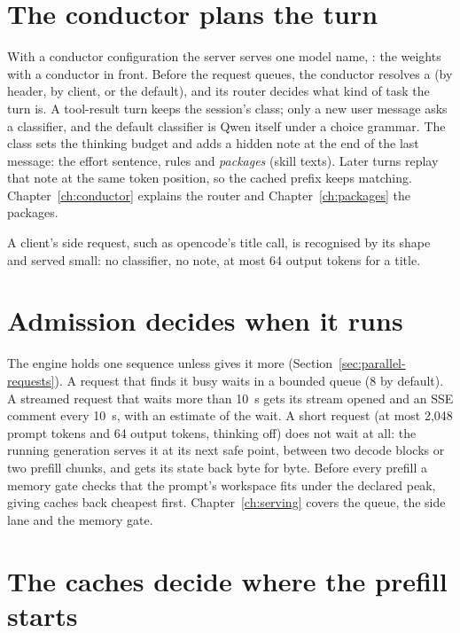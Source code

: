 \section{The conductor plans the turn}

With a conductor configuration the server serves one model name, : the weights with a conductor in front. Before the request queues, the conductor resolves a  (by header, by client, or the default), and its router decides what kind of task the turn is. A tool-result turn keeps the session's class; only a new user message asks a classifier, and the default classifier is Qwen itself under a choice grammar. The class sets the thinking budget and adds a hidden note at the end of the last message: the effort sentence, rules and \emph{packages} (skill texts). Later turns replay that note at the same token position, so the cached prefix keeps matching. Chapter~\ref{ch:conductor} explains the router and Chapter~\ref{ch:packages} the packages.

A client's side request, such as opencode's title call, is recognised by its shape and served small: no classifier, no note, at most 64 output tokens for a title.

\section{Admission decides when it runs}

The engine holds one sequence unless  gives it more (Section~\ref{sec:parallel-requests}). A request that finds it busy waits in a bounded queue (8 by default). A streamed request that waits more than 10~s gets its stream opened and an SSE comment every 10~s, with an estimate of the wait. A short request (at most 2,048 prompt tokens and 64 output tokens, thinking off) does not wait at all: the running generation serves it at its next safe point, between two decode blocks or two prefill chunks, and gets its state back byte for byte. Before every prefill a memory gate checks that the prompt's workspace fits under the declared peak, giving caches back cheapest first. Chapter~\ref{ch:serving} covers the queue, the side lane and the memory gate.

\section{The caches decide where the prefill starts}

